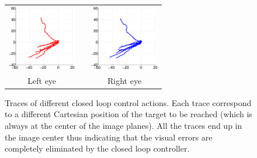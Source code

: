\begin{figure}
  \begin{center}
	\begin{tabular}{ccc}
	  \parbox{30mm}{\includegraphics[width=30mm]{Figure/LeftEyeClosedLoop.eps}}  & \hspace{.1cm} &
	  \parbox{30mm}{\includegraphics[width=30mm]{Figure/RightEyeClosedLoop.eps}}
	  \\
	  \parbox{30mm}{\centering Left eye } & \hspace{0.1cm} & \parbox{30mm}{\centering Right eye }
  \end{tabular}
\end{center}
\caption{Traces of different closed loop control actions. Each trace correspond to a different Cartesian position of the target to be reached (which 
is always at the center of the image planes). All the traces end up in the image center thus indicating that the visual errors are completely eliminated by the closed loop controller.}\label{Fig:ImagePlaneClosedLoopErrors}
  \end{figure}


